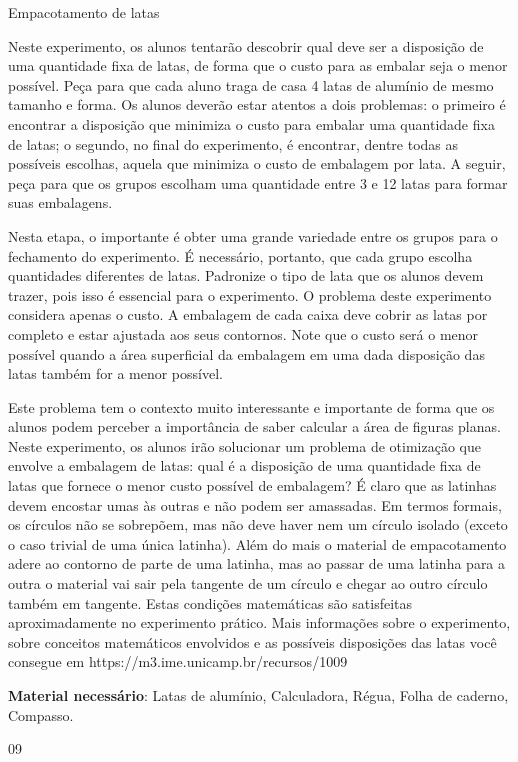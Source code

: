\begin{sugestions}{Empacotamento de latas}
{
  Neste experimento, os alunos tentarão descobrir qual deve ser a disposição de uma quantidade fixa de latas, de forma que o custo para as embalar seja o menor possível. Peça para que cada aluno traga de casa 4 latas de alumínio de mesmo tamanho e forma. Os alunos deverão estar atentos a dois problemas: o primeiro é encontrar a disposição que minimiza o custo para embalar uma quantidade fixa de latas; o segundo, no final do experimento, é encontrar, dentre todas as possíveis escolhas, aquela que minimiza o custo de embalagem por lata. A seguir, peça para que os grupos escolham uma quantidade entre 3 e 12 latas para formar suas embalagens. 

  Nesta etapa, o importante é obter uma grande variedade entre os grupos para o fechamento do experimento. É necessário, portanto, que cada grupo escolha quantidades diferentes de latas. Padronize o tipo de lata que os alunos devem trazer, pois isso é essencial para o experimento. O problema deste experimento considera apenas o custo. A embalagem de cada caixa deve cobrir as latas por completo e estar ajustada aos seus contornos. Note que o custo será o menor possível quando a área superficial da embalagem em uma dada disposição das latas também for a menor possível. 

  Este problema tem o contexto muito interessante e importante de forma que os alunos podem perceber a importância de saber calcular a área de figuras planas. Neste experimento, os alunos irão solucionar um problema de otimização que envolve a embalagem de latas: qual é a disposição de uma quantidade fixa de latas que fornece o menor custo possível de embalagem? É claro que as latinhas devem encostar umas às outras e não podem ser amassadas. Em termos formais, os círculos não se sobrepõem, mas não deve haver nem um círculo isolado (exceto o caso trivial de uma única latinha). Além do mais o material de empacotamento adere ao contorno de parte de uma latinha, mas ao passar de uma latinha para a outra o material vai sair pela tangente de um círculo e chegar ao outro círculo também em tangente. Estas condições matemáticas são satisfeitas aproximadamente no experimento prático. Mais informações sobre o experimento, sobre conceitos matemáticos envolvidos e as possíveis disposições das latas você consegue em https://m3.ime.unicamp.br/recursos/1009 

  \textbf{Material necessário}: Latas de alumínio, Calculadora, Régua, Folha de caderno, Compasso.
}{0}{9}
\end{sugestions}
